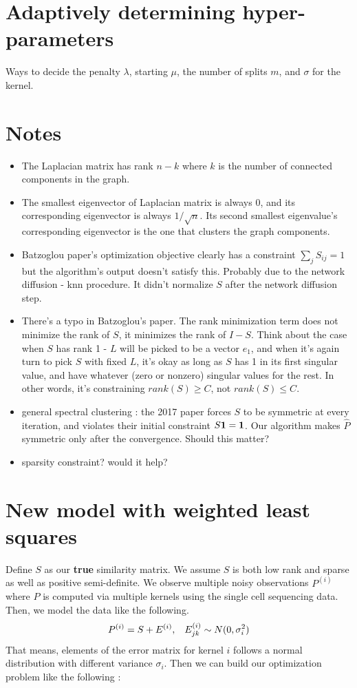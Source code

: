\documentclass[11pt]{article}
\begin{document}
\section*{Adaptively determining hyper-parameters}
Ways to decide the penalty $\lambda$, starting $\mu$, the number of splits $m$, and $\sigma$ for the kernel. 



\section*{Notes}
\begin{itemize}
\item The Laplacian matrix has rank $n-k$ where $k$ is the number of connected components in the graph. 
\item The smallest eigenvector of Laplacian matrix is always 0, and its corresponding eigenvector is always $1/\sqrt{n}$. Its second smallest eigenvalue's corresponding eigenvector is the one that clusters the graph components. 
\item Batzoglou paper's optimization objective clearly has a constraint $\sum_j S_{ij} = 1$ but the algorithm's output doesn't satisfy this. Probably due to the network diffusion - knn procedure. It didn't normalize $S$ after the network diffusion step.
\item There's a typo in Batzoglou's paper. The rank minimization term does not minimize the rank of $S$, it minimizes the rank of $I-S$. Think about the case when $S$ has rank 1 - $L$ will be picked to be a vector $e_1$, and when it's again turn to pick $S$ with fixed $L$, it's okay as long as $S$ has 1 in its first singular value, and have whatever (zero or nonzero) singular values for the rest. In other words, it's constraining $rank(S) \geq C$, not $rank(S) \leq C$. 
\item general spectral clustering : the 2017 paper forces $S$ to be symmetric at every iteration, and violates their initial constraint $S\bf{1} = \bf{1}$. Our algorithm makes $\hat{P}$ symmetric only after the convergence. Should this matter?
\item sparsity constraint? would it help?
\end{itemize}


\section*{New model with weighted least squares}
Define $S$ as our \textbf{true} similarity matrix. We assume $S$ is both low rank and sparse as well as positive semi-definite. We observe multiple noisy observations $P^{(i)}$ where $P$ is computed via multiple kernels using the single cell sequencing data. Then, we model the data like the following.
$$P^{(i)} = S + E^{(i)},\hspace{3mm} E^{(i)}_{jk} \sim N(0, \sigma_i^2)$$
That means, elements of the error matrix for kernel $i$ follows a normal distribution with different variance $\sigma_i$. Then we can build our optimization problem like the following :
\end{document}

